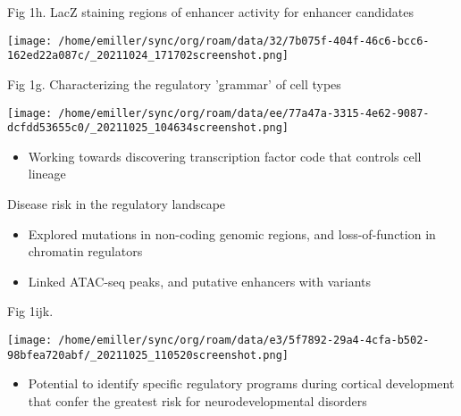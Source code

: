 \documentclass[bigger]{beamer}
\begin{document}
\begin{frame}[label={sec:org411305e}]{Fig 1h. LacZ staining regions of enhancer activity for enhancer candidates}
\begin{center}
\texttt{[image: /home/emiller/sync/org/roam/data/32/7b075f-404f-46c6-bcc6-162ed22a087c/\_20211024\_171702screenshot.png]}
\end{center}
\end{frame}


\begin{frame}[label={sec:org234d038}]{Fig 1g. Characterizing the regulatory 'grammar' of cell types}
\begin{center}
\texttt{[image: /home/emiller/sync/org/roam/data/ee/77a47a-3315-4e62-9087-dcfdd53655c0/\_20211025\_104634screenshot.png]}
\end{center}

\begin{itemize}
\item Working towards discovering transcription factor code that controls cell
lineage
\end{itemize}
\end{frame}

\begin{frame}[label={sec:orgfc4e140}]{Disease risk in the regulatory landscape}
\begin{itemize}
\item Explored mutations in non-coding genomic regions, and loss-of-function in
chromatin regulators
\item Linked ATAC-seq peaks, and putative enhancers with variants
\end{itemize}
\end{frame}

\begin{frame}[label={sec:org9ae2bc8}]{Fig 1ijk.}
\begin{center}
\texttt{[image: /home/emiller/sync/org/roam/data/e3/5f7892-29a4-4cfa-b502-98bfea720abf/\_20211025\_110520screenshot.png]}
\end{center}

\begin{itemize}
\item Potential to identify specific regulatory programs during cortical development
that confer the greatest risk for neurodevelopmental disorders
\end{itemize}
\end{frame}
\end{document}
